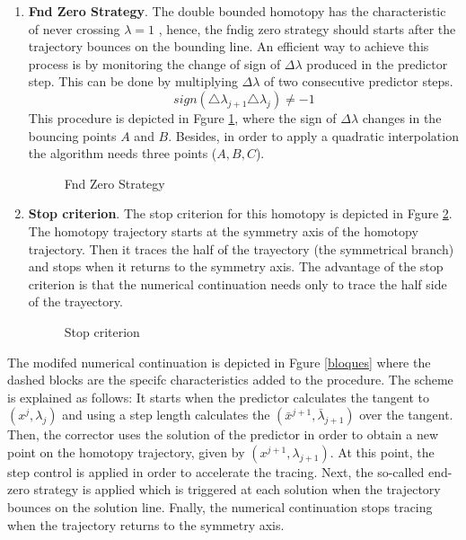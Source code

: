 \documentclass[conference]{IEEEtran}
\begin{document}
\begin{enumerate}
\item { \bf Fnd Zero Strategy}. The double bounded homotopy
has the characteristic of never crossing $\lambda=1$ \cite{homo_iscas05}, hence, the fndig zero strategy
should starts after the trajectory   bounces on the bounding line. An
efficient way to achieve this process is by monitoring the
change of sign of $\Delta\lambda$ produced in the predictor step. This
can be done by multiplying
$\Delta\lambda$ of two consecutive predictor steps. 
\begin{displaymath}
sign(\triangle \lambda_{j+1}  \triangle \lambda_j) \ne -1 
\label{zero1}
\end{displaymath}
This procedure is depicted in Fgure \ref{halftrack3}, where the  sign of  $\Delta\lambda$ changes in the bouncing  points $A$ and $B$. Besides, in order to apply a quadratic interpolation
the algorithm needs three points ($A,B,C$).

\begin{figure}[hbtp]
\centerline{
\epsfxsize=50mm
}
\caption{Fnd Zero Strategy}
\label{halftrack3}
\end{figure}
\item{\bf Stop criterion}. The stop criterion for this homotopy is depicted in Fgure \ref{halftrack1}. The homotopy trajectory starts at the symmetry axis of
the homotopy trajectory. Then it traces the half of the trayectory (the symmetrical branch) and stops when it returns to the symmetry axis.
The advantage of the stop criterion is that the numerical continuation
needs only to trace the half side of the trayectory.
\begin{figure}[hbtp]
\centerline{
\epsfxsize=55mm
}
\caption{Stop criterion}
\label{halftrack1}
\end{figure}
\end{enumerate}

The modifed numerical continuation is depicted in Fgure \ref{bloques}
where the dashed blocks are the specifc characteristics added to the procedure.
The scheme is explained as follows: It starts when the predictor  calculates the tangent to
$(x^j,\lambda_j)$ and using a step length calculates the $(\bar{x}^{j+1},\bar{\lambda}_{j+1})$
over the tangent. Then, the corrector uses the solution of the predictor in order to obtain
a new point on the homotopy trajectory, given by  $(x^{j+1},\lambda_{j+1})$.
At this point, the step control is applied in order to accelerate the tracing.
Next, the so-called end-zero strategy is applied which is 
triggered at each solution when the trajectory bounces on
the solution line.
Fnally, the numerical continuation stops tracing when the trajectory returns to the symmetry axis.
\end{document}
